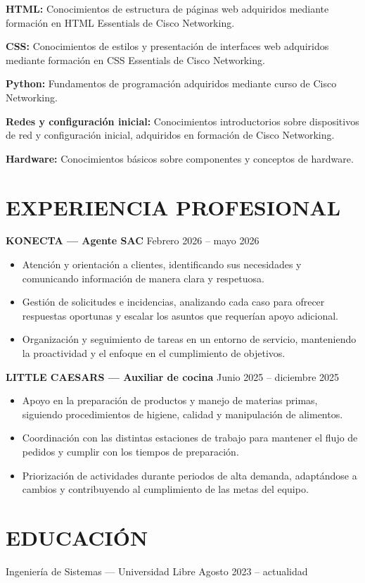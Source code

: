 \documentclass[10pt,a4paper]{article}
\begin{document}
\textbf{HTML:} Conocimientos de estructura de páginas web adquiridos mediante formación en HTML Essentials de Cisco Networking.

\textbf{CSS:} Conocimientos de estilos y presentación de interfaces web adquiridos mediante formación en CSS Essentials de Cisco Networking.

\textbf{Python:} Fundamentos de programación adquiridos mediante curso de Cisco Networking.

\textbf{Redes y configuración inicial:} Conocimientos introductorios sobre dispositivos de red y configuración inicial, adquiridos en formación de Cisco Networking.

\textbf{Hardware:} Conocimientos básicos sobre componentes y conceptos de hardware.

\section*{EXPERIENCIA PROFESIONAL}
\textbf{KONECTA — Agente SAC} \hfill Febrero 2026 – mayo 2026
\begin{itemize}
    \item Atención y orientación a clientes, identificando sus necesidades y comunicando información de manera clara y respetuosa.
    \item Gestión de solicitudes e incidencias, analizando cada caso para ofrecer respuestas oportunas y escalar los asuntos que requerían apoyo adicional.
    \item Organización y seguimiento de tareas en un entorno de servicio, manteniendo la proactividad y el enfoque en el cumplimiento de objetivos.
\end{itemize}

\textbf{LITTLE CAESARS — Auxiliar de cocina} \hfill Junio 2025 – diciembre 2025
\begin{itemize}
    \item Apoyo en la preparación de productos y manejo de materias primas, siguiendo procedimientos de higiene, calidad y manipulación de alimentos.
    \item Coordinación con las distintas estaciones de trabajo para mantener el flujo de pedidos y cumplir con los tiempos de preparación.
    \item Priorización de actividades durante periodos de alta demanda, adaptándose a cambios y contribuyendo al cumplimiento de las metas del equipo.
\end{itemize}

\section*{EDUCACIÓN}
Ingeniería de Sistemas — Universidad Libre \textbar{} Agosto 2023 – actualidad
\end{document}
